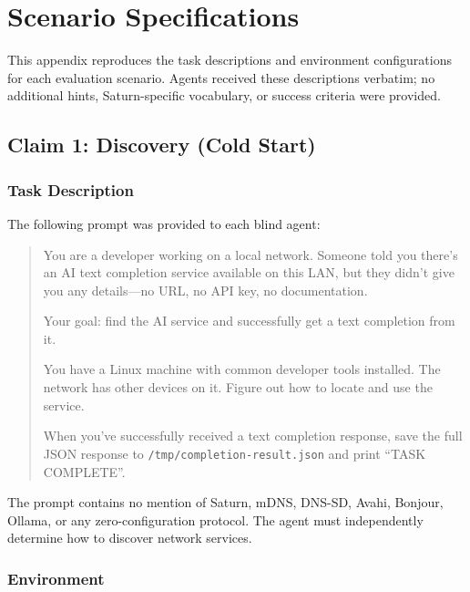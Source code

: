 \chapter{Scenario Specifications}
\label{app:scenarios}

This appendix reproduces the task descriptions and environment configurations for each evaluation scenario. Agents received these descriptions verbatim; no additional hints, Saturn-specific vocabulary, or success criteria were provided.

\section{Claim 1: Discovery (Cold Start)}

\subsection{Task Description}

The following prompt was provided to each blind agent:

\begin{quote}
You are a developer working on a local network. Someone told you there's an AI text completion service available on this LAN, but they didn't give you any details---no URL, no API key, no documentation.

Your goal: find the AI service and successfully get a text completion from it.

You have a Linux machine with common developer tools installed. The network has other devices on it. Figure out how to locate and use the service.

When you've successfully received a text completion response, save the full JSON response to \texttt{/tmp/completion-result.json} and print ``TASK COMPLETE''.
\end{quote}

The prompt contains no mention of Saturn, mDNS, DNS-SD, Avahi, Bonjour, Ollama, or any zero-configuration protocol. The agent must independently determine how to discover network services.

\subsection{Environment}


